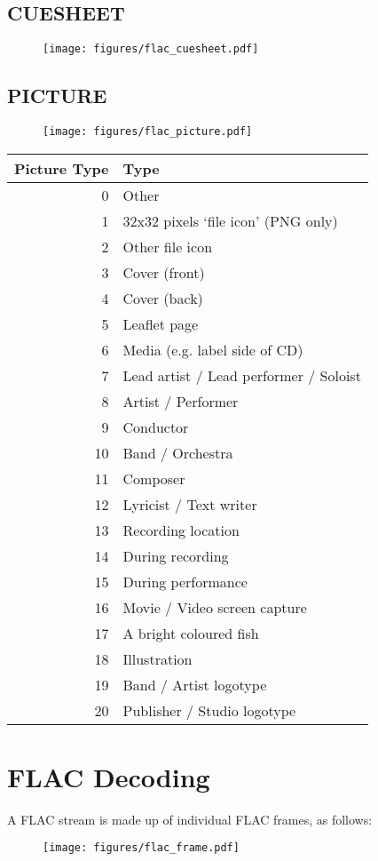 \pagebreak

\subsection{CUESHEET}
\begin{figure}[h]
\texttt{[image: figures/flac\_cuesheet.pdf]}
\end{figure}

\subsection{PICTURE}
\begin{figure}[h]
\texttt{[image: figures/flac\_picture.pdf]}
\end{figure}
\begin{tabular}{|r|l|}
\hline
Picture Type & Type \\
\hline
0 & Other \\
1 & 32x32 pixels `file icon' (PNG only) \\
2 & Other file icon \\
3 & Cover (front) \\
4 & Cover (back) \\
5 & Leaflet page \\
6 & Media (e.g. label side of CD) \\
7 & Lead artist / Lead performer / Soloist \\
8 & Artist / Performer \\
9 & Conductor \\
10 & Band / Orchestra \\
11 & Composer \\
12 & Lyricist / Text writer \\
13 & Recording location \\
14 & During recording \\
15 & During performance \\
16 & Movie / Video screen capture \\
17 & A bright coloured fish \\
18 & Illustration \\
19 & Band / Artist logotype \\
20 & Publisher / Studio logotype \\
\hline
\end{tabular}

\section{FLAC Decoding}
A FLAC stream is made up of individual FLAC frames, as follows:
\begin{figure}[h]
\texttt{[image: figures/flac\_frame.pdf]}
\end{figure}

